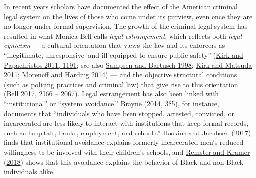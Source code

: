 \documentclass[
  12pt,
]{article}
\begin{document}
In recent years scholars have documented the effect of the American criminal legal system on the lives of those who come under its purview, even once they are no longer under formal supervision. The growth of the criminal legal system has resulted in what Monica Bell calls \emph{legal estrangement}, which reflects both \emph{legal cynicism} --- a cultural orientation that views the law and its enforcers as ``illegitimate, unresponsive, and ill equipped to ensure public safety'' (\protect\hyperlink{ref-Kirk2011a}{Kirk and Papachristos 2011, 1191}; see also \protect\hyperlink{ref-Sampson1998}{Sampson and Bartusch 1998}; \protect\hyperlink{ref-Kirk2011}{Kirk and Matsuda 2011}; \protect\hyperlink{ref-Morenoff2014}{Morenoff and Harding 2014}) --- and the objective structural conditions (such as policing practices and criminal law) that give rise to this orientation (\protect\hyperlink{ref-Bell2017}{Bell 2017, 2066} -- 2067). Legal estrangement has also been linked with ``institutional'' or ``system avoidance.'' Brayne (\protect\hyperlink{ref-Brayne2014}{2014, 385}), for instance, documents that ``individuals who have been stopped, arrested, convicted, or incarcerated are less likely to interact with institutions that keep formal records, such as hospitals, banks, employment, and schools.'' \protect\hyperlink{ref-Haskins2017}{Haskins and Jacobsen} (\protect\hyperlink{ref-Haskins2017}{2017}) finds that institutional avoidance explains formerly incarcerated men's reduced willingness to be involved with their children's schools, and \protect\hyperlink{ref-Remster2018}{Remster and Kramer} (\protect\hyperlink{ref-Remster2018}{2018}) shows that this avoidance explains the behavior of Black and non-Black individuals alike.
\end{document}
